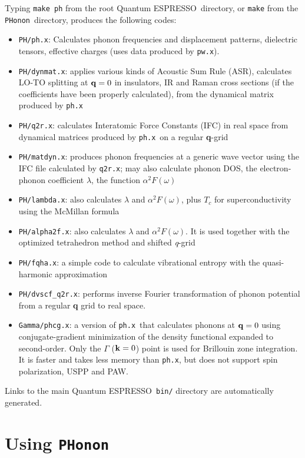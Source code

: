 \documentclass[12pt,a4paper]{article}
\def\qe{{\sc Quantum ESPRESSO}}
\def\pwx{\texttt{pw.x}}
\def\phx{\texttt{ph.x}}
\def\PHonon{\texttt{PHonon}}
\begin{document}
Typing \texttt{make ph} from the root \qe\ directory, or \texttt{make} 
from the \PHonon\ directory, produces the following codes:
\begin{itemize}
  \item \texttt{PH/ph.x}: Calculates phonon frequencies and displacement patterns,
    dielectric tensors, effective charges (uses data produced by \pwx). 
  \item \texttt{PH/dynmat.x}: applies various kinds of Acoustic Sum Rule (ASR),
    calculates LO-TO splitting at ${\bf q} = 0$ in insulators, IR and Raman
    cross sections (if the coefficients have been properly calculated),
    from the dynamical matrix produced by \phx
  \item \texttt{PH/q2r.x}: calculates Interatomic Force Constants (IFC) in real space
    from dynamical matrices produced by \phx\ on a regular {\bf q}-grid 
 \item \texttt{PH/matdyn.x}: produces phonon frequencies at a generic wave vector
   using the IFC file calculated by \texttt{q2r.x}; may also calculate phonon
   DOS, the electron-phonon coefficient $\lambda$, the function
   $\alpha^2F(\omega)$
\item \texttt{PH/lambda.x}: also calculates $\lambda$ and $\alpha^2F(\omega)$,
   plus $T_c$ for  superconductivity using the McMillan formula
\item \texttt{PH/alpha2f.x}: also calculates $\lambda$ and $\alpha^2F(\omega)$.
  It is used together with the optimized tetrahedron method and shifted
  {\it q}-grid
\item \texttt{PH/fqha.x}: a simple code to calculate vibrational entropy with
   the quasi-harmonic approximation
\item \texttt{PH/dvscf\_q2r.x}: performs inverse Fourier transformation of phonon
   potential from a regular {\bf q} grid to real space.
\item \texttt{Gamma/phcg.x}:
  a version of \phx\ that calculates phonons at ${\bf q} = 0$ using
  conjugate-gradient minimization of the density functional expanded to
  second-order. Only the $\Gamma$ (${\bf k} = 0$) point is used for
  Brillouin zone integration. It is faster and takes less memory than
  \phx, but does not support spin polarization, USPP and PAW.
\end{itemize}
Links to the main \qe\ \texttt{bin/} directory are automatically generated.
   
\section{Using \PHonon}
\end{document}
